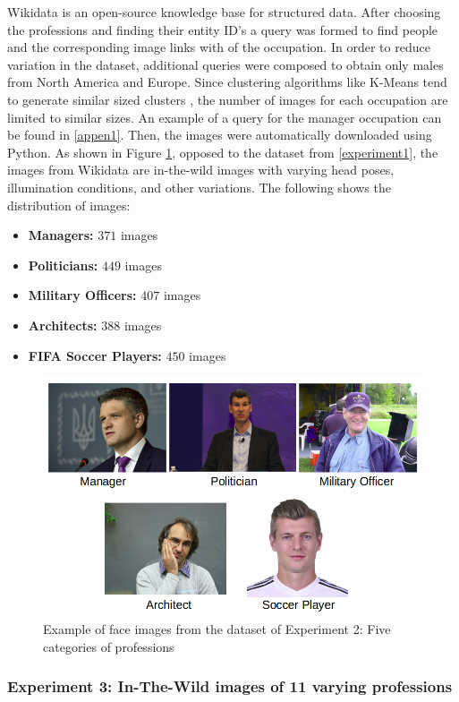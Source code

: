 \documentclass[12pt,english]{article}
\begin{document}
Wikidata is an open-source knowledge base for structured data. After choosing the professions and finding their entity ID's a query was formed to find people and the corresponding image links with of the occupation. In order to reduce variation in the dataset, additional queries were composed to obtain only males from North America and Europe. Since clustering algorithms like K-Means tend to generate similar sized clusters \cite{shi}, the number of images for each occupation are limited to similar sizes. An example of a query for the manager occupation can be found in \ref{appen1}. Then, the images were automatically downloaded using Python. As shown in Figure \ref{fig:prof}, opposed to the dataset from \ref{experiment1}, the images from Wikidata are in-the-wild images with varying head poses, illumination conditions, and other variations. The following shows the distribution of images:

\begin{itemize}
\item \textbf{Managers: } $371$ images
\item \textbf{Politicians: } $449$ images
\item \textbf{Military Officers: } $407$ images
\item \textbf{Architects: } $388$ images
\item \textbf{FIFA Soccer Players: } $450$ images
\end{itemize}

\begin{figure}[!tbp]
 \centering
    \includegraphics[width=0.7\columnwidth]{figures/ex2.png}
    \caption{Example of face images from the dataset of Experiment 2: Five categories of professions \cite{data1}}
	\label{fig:prof}
\end{figure}

\subsubsection{Experiment 3: In-The-Wild images of 11 varying professions}
\end{document}
